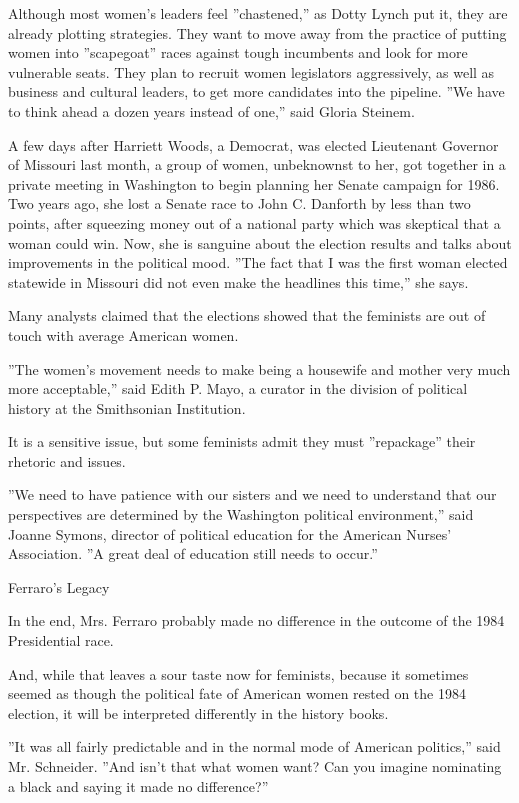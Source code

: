 Although most women's leaders feel ''chastened,'' as Dotty Lynch put it,
they are already plotting strategies. They want to move away from the
practice of putting women into ''scapegoat'' races against tough
incumbents and look for more vulnerable seats. They plan to recruit
women legislators aggressively, as well as business and cultural
leaders, to get more candidates into the pipeline. ''We have to think
ahead a dozen years instead of one,'' said Gloria Steinem.

A few days after Harriett Woods, a Democrat, was elected Lieutenant
Governor of Missouri last month, a group of women, unbeknownst to her,
got together in a private meeting in Washington to begin planning her
Senate campaign for 1986. Two years ago, she lost a Senate race to John
C. Danforth by less than two points, after squeezing money out of a
national party which was skeptical that a woman could win. Now, she is
sanguine about the election results and talks about improvements in the
political mood. ''The fact that I was the first woman elected statewide
in Missouri did not even make the headlines this time,'' she says.

Many analysts claimed that the elections showed that the feminists are
out of touch with average American women.

''The women's movement needs to make being a housewife and mother very
much more acceptable,'' said Edith P. Mayo, a curator in the division of
political history at the Smithsonian Institution.

It is a sensitive issue, but some feminists admit they must
''repackage'' their rhetoric and issues.

''We need to have patience with our sisters and we need to understand
that our perspectives are determined by the Washington political
environment,'' said Joanne Symons, director of political education for
the American Nurses' Association. ''A great deal of education still
needs to occur.''

Ferraro's Legacy

In the end, Mrs. Ferraro probably made no difference in the outcome of
the 1984 Presidential race.

And, while that leaves a sour taste now for feminists, because it
sometimes seemed as though the political fate of American women rested
on the 1984 election, it will be interpreted differently in the history
books.

''It was all fairly predictable and in the normal mode of American
politics,'' said Mr. Schneider. ''And isn't that what women want? Can
you imagine nominating a black and saying it made no difference?''

